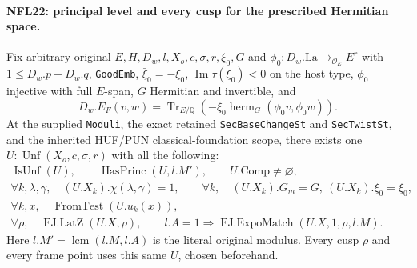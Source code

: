 \documentclass[11pt,a4paper]{article}
\numberwithin{equation}{section}
\theoremstyle{remark}\newtheorem{remark}[theorem]{Remark}
\begin{document}
\paragraph{NFL22: principal level and every cusp for the prescribed Hermitian space.}
\label{claim:NFL22}
Fix arbitrary original $E,H,D_w,l,X_o,c,\sigma,r,\xi_0,G$ and
$\phi_0:D_w.\mathrm{La}\to_{\mathcal O_E}E^r$ with
$1\le D_w.p+D_w.q$, \texttt{Good\allowbreak Emb}, $\bar\xi_0=-\xi_0$,
$\operatorname{Im}\tau(\xi_0)<0$ on the host type,
$\phi_0$ injective with full $E$-span, $G$ Hermitian and invertible,
and
\[
 D_w.E_F(v,w)=\operatorname{Tr}_{E/\mathbb Q}
       (-\xi_0\operatorname{herm}_G(\phi_0v,\phi_0w)).
\]
At the supplied \texttt{Moduli}, the exact retained
\texttt{Sec\allowbreak Base\allowbreak Change\allowbreak St} and \texttt{Sec\allowbreak Twist\allowbreak St}, and the
inherited HUF/PUN classical-foundation scope, there exists one
$U:\operatorname{Unf}(X_o,c,\sigma,r)$ with all the following:
\[
 \begin{gathered}
 \operatorname{IsUnf}(U),\qquad
 \operatorname{HasPrinc}(U,l.M'),\qquad U.\mathrm{Comp}\ne\varnothing,\\
 \forall k,\lambda,\gamma,\quad (U.X_k).\chi(\lambda,\gamma)=1,\qquad
 \forall k,\quad (U.X_k).G_m=G,\ (U.X_k).\xi_0=\xi_0,\\
 \forall k,x,\quad\operatorname{FromTest}(U.u_k(x)),\\
 \forall\rho,\quad\operatorname{FJ.LatZ}(U.X,\rho),\qquad
 l.A=1\Longrightarrow\operatorname{FJ.ExpoMatch}(U.X,1,\rho,l.M).
 \end{gathered}
 \tag{NFL.29}
\]
Here $l.M'=\operatorname{lcm}(l.M,l.A)$ is the literal original
modulus.  Every cusp $\rho$ and every frame point uses this
same $U$, chosen beforehand.
\end{document}
